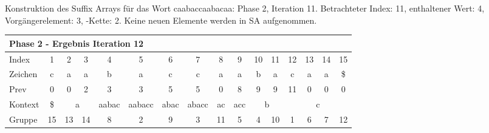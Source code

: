 \begin{table}[H]
\caption[Konstruktion des Suffix Arrays für das Wort caabaccaabacaa: Phase 2, Iteration 11]{Konstruktion des Suffix Arrays für das Wort caabaccaabacaa: Phase 2, Iteration 11. Betrachteter Index: 11, enthaltener Wert: 4, Vorgängerelement: 3, \prevpointer-Kette: 2. Keine neuen Elemente werden in SA aufgenommen.}
\label{table_complex_example_2_11} 
\end{table}

\begin{table}[H]
\centering
\begin{adjustbox}{max width=\textwidth}
\centering
\begin{tabular}{lccccccccccccccc}
\multicolumn{16}{l}{Phase 2 - Ergebnis Iteration 12}                                                                                                                                                                                                                                                                                      \\ \hline
\multicolumn{1}{l|}{Index}   & 1                       & 2  & 3                       & 4                          & 5                           & 6                         & 7                          & 8                       & 9                        & 10 & 11                      & 12                         & 13 & 14 & 15 \\
\multicolumn{1}{l|}{Zeichen} & c                       & a  & a                       & b                          & a                           & c                         & c                          & a                       & a                        & b  & a                       & c                          & a  & a  & \$ \\
\multicolumn{1}{l|}{Prev}    & 0                       & 0  & 2                       & 3                          & 3                           & 5                         & 5                          & 0                       & 8                        & 9  & 9                       & 11                         & 0  & 0  & 0  \\ \hline
\multicolumn{1}{l|}{Kontext} & \multicolumn{1}{c|}{\$} & \multicolumn{2}{c|}{a}       & \multicolumn{1}{c|}{aabac} & \multicolumn{1}{c|}{aabacc} & \multicolumn{1}{c|}{abac} & \multicolumn{1}{c|}{abacc} & \multicolumn{1}{c|}{ac} & \multicolumn{1}{c|}{acc} & \multicolumn{2}{c|}{b}       & \multicolumn{4}{c}{c}                     \\
\multicolumn{1}{l|}{Gruppe}  & \multicolumn{1}{c|}{15} & 13 & \multicolumn{1}{c|}{14} & \multicolumn{1}{c|}{8}     & \multicolumn{1}{c|}{2}      & \multicolumn{1}{c|}{9}    & \multicolumn{1}{c|}{3}     & \multicolumn{1}{c|}{11} & \multicolumn{1}{c|}{5}   & 4  & \multicolumn{1}{c|}{10} & 1                          & 6  & 7  & 12 \\

\end{tabular}
\end{adjustbox}
\end{table}
